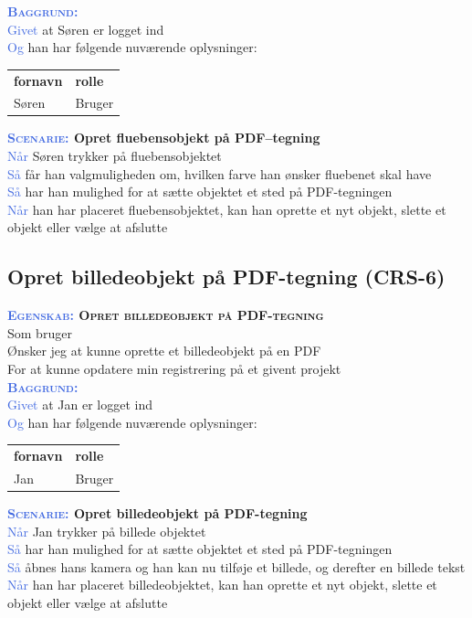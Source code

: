 \textsc{\textcolor{RoyalBlue}{\textbf{Baggrund:}}}\\
\textcolor{RoyalBlue}{Givet} at Søren er logget ind\\
\textcolor{RoyalBlue}{Og} han har følgende nuværende oplysninger:\\
\begin{tabular}{| l | l |}
	\textbf{fornavn} & \textbf{rolle} \\
	Søren & Bruger\\
\end{tabular}

\textbf{\textsc{\textcolor{RoyalBlue}{Scenarie:}} Opret fluebensobjekt på PDF--tegning}\\
\textcolor{RoyalBlue}{Når} Søren trykker på fluebensobjektet\\
\textcolor{RoyalBlue}{Så}  får han valgmuligheden om, hvilken farve han ønsker fluebenet skal have\\
\textcolor{RoyalBlue}{Så}  har han mulighed for at sætte objektet et sted på PDF-tegningen\\
\textcolor{RoyalBlue}{Når} han har placeret fluebensobjektet, kan han oprette et nyt objekt, slette et objekt eller vælge at afslutte \\

\subsection{Opret billedeobjekt på PDF-tegning (CRS-6)} \label{sec:USOpretBillede}
\textbf{\textsc{\textcolor{RoyalBlue}{Egenskab:} Opret billedeobjekt på PDF-tegning}}\\
Som bruger\\
Ønsker jeg at kunne oprette et billedeobjekt på en PDF\\
For at kunne opdatere min registrering på et givent projekt \\

\textsc{\textcolor{RoyalBlue}{\textbf{Baggrund:}}}\\
\textcolor{RoyalBlue}{Givet} at Jan er logget ind\\
\textcolor{RoyalBlue}{Og} han har følgende nuværende oplysninger:\\
\begin{tabular}{| l | l |}
	\textbf{fornavn} & \textbf{rolle} \\
	Jan & Bruger\\
\end{tabular}

\textbf{\textsc{\textcolor{RoyalBlue}{Scenarie:}} Opret billedeobjekt på PDF-tegning}\\
\textcolor{RoyalBlue}{Når} Jan trykker på billede objektet\\
\textcolor{RoyalBlue}{Så}  har han mulighed for at sætte objektet et sted på PDF-tegningen\\
\textcolor{RoyalBlue}{Så}  åbnes hans kamera og han kan nu tilføje et billede, og derefter en billede tekst\\
\textcolor{RoyalBlue}{Når} han har placeret billedeobjektet, kan han oprette et nyt objekt, slette et objekt eller vælge at afslutte \\

